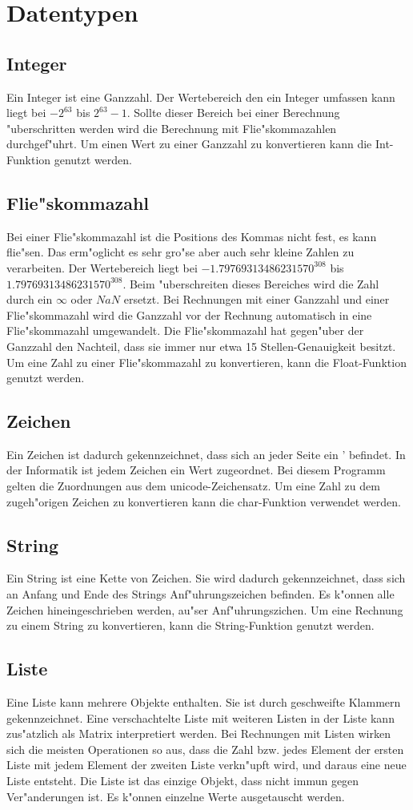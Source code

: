 \documentclass{scrartcl}
\begin{document}
\section{Datentypen}
\subsection{Integer}
Ein Integer ist eine Ganzzahl. Der Wertebereich den ein Integer umfassen kann liegt bei $-2^{63}$ bis $2^{63}-1$. Sollte dieser Bereich bei einer Berechnung "uberschritten werden wird die Berechnung mit Flie"skommazahlen durchgef"uhrt. Um einen Wert zu einer Ganzzahl zu konvertieren kann die Int-Funktion genutzt werden.
\subsection{Flie"skommazahl}
Bei einer Flie"skommazahl ist die Positions des Kommas nicht fest, es kann flie"sen. Das erm"oglicht es sehr gro"se aber auch sehr kleine Zahlen zu verarbeiten. Der Wertebereich liegt bei $-1.79769313486231570^{308}$ bis $1.79769313486231570^{308}$. Beim "uberschreiten dieses Bereiches wird die Zahl durch ein $\infty$ oder $NaN$ ersetzt. Bei Rechnungen mit einer Ganzzahl und einer Flie"skommazahl wird die Ganzzahl vor der Rechnung automatisch in eine Flie"skommazahl umgewandelt. Die Flie"skommazahl hat gegen"uber der Ganzzahl den Nachteil, dass sie immer nur etwa 15 Stellen-Genauigkeit besitzt. Um eine Zahl zu einer Flie"skommazahl zu konvertieren, kann die Float-Funktion genutzt werden.
\subsection{Zeichen}
Ein Zeichen ist dadurch gekennzeichnet, dass sich an jeder Seite ein ' befindet. In der Informatik ist jedem Zeichen ein Wert zugeordnet. Bei diesem Programm gelten die Zuordnungen aus dem unicode-Zeichensatz. Um eine Zahl zu dem zugeh"origen Zeichen zu konvertieren kann die char-Funktion verwendet werden.
\subsection{String}
Ein String ist eine Kette von Zeichen. Sie wird dadurch gekennzeichnet, dass sich an Anfang und Ende des Strings Anf"uhrungszeichen befinden. Es k"onnen alle Zeichen hineingeschrieben werden, au"ser Anf"uhrungszichen. Um eine Rechnung zu einem String zu konvertieren, kann die String-Funktion genutzt werden.
\subsection{Liste}
Eine Liste kann mehrere Objekte enthalten. Sie ist durch geschweifte Klammern gekennzeichnet. Eine verschachtelte Liste mit weiteren Listen in der Liste kann zus"atzlich als Matrix interpretiert werden. Bei Rechnungen mit Listen wirken sich die meisten Operationen so aus, dass die Zahl bzw. jedes Element der ersten Liste mit jedem Element der zweiten Liste verkn"upft wird, und daraus eine neue Liste entsteht. Die Liste ist das einzige Objekt, dass nicht immun gegen Ver"anderungen ist. Es k"onnen einzelne Werte ausgetauscht werden.
\end{document}
